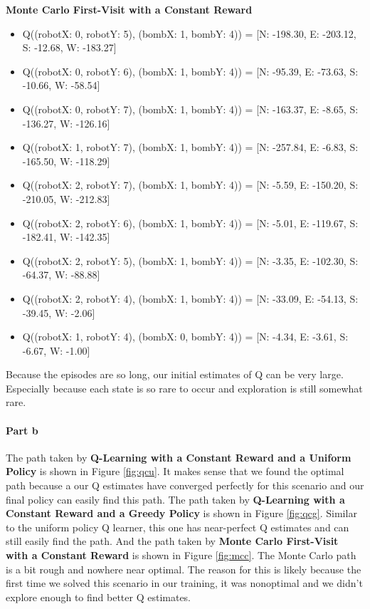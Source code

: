 \documentclass[12pt]{article}
\begin{document}
\textbf{Monte Carlo First-Visit with a Constant Reward}
\begin{itemize}
  \item Q((robotX: 0, robotY: 5), (bombX: 1, bombY: 4)) = [N: -198.30, E: -203.12, S: -12.68, W: -183.27]
  \item Q((robotX: 0, robotY: 6), (bombX: 1, bombY: 4)) = [N: -95.39, E: -73.63, S: -10.66, W: -58.54]
  \item Q((robotX: 0, robotY: 7), (bombX: 1, bombY: 4)) = [N: -163.37, E: -8.65, S: -136.27, W: -126.16]
  \item Q((robotX: 1, robotY: 7), (bombX: 1, bombY: 4)) = [N: -257.84, E: -6.83, S: -165.50, W: -118.29]
  \item Q((robotX: 2, robotY: 7), (bombX: 1, bombY: 4)) = [N: -5.59, E: -150.20, S: -210.05, W: -212.83]
  \item Q((robotX: 2, robotY: 6), (bombX: 1, bombY: 4)) = [N: -5.01, E: -119.67, S: -182.41, W: -142.35]
  \item Q((robotX: 2, robotY: 5), (bombX: 1, bombY: 4)) = [N: -3.35, E: -102.30, S: -64.37, W: -88.88]
  \item Q((robotX: 2, robotY: 4), (bombX: 1, bombY: 4)) = [N: -33.09, E: -54.13, S: -39.45, W: -2.06]
  \item Q((robotX: 1, robotY: 4), (bombX: 0, bombY: 4)) = [N: -4.34, E: -3.61, S: -6.67, W: -1.00]
\end{itemize}

Because the episodes are so long, our initial estimates of Q can be very large. Especially because each state is so rare to occur and exploration is still somewhat rare.

\paragraph{Part b} The path taken by \textbf{Q-Learning with a Constant Reward and a Uniform Policy} is shown in Figure \ref{fig:qcu}. It makes sense that we found the optimal path because a our Q estimates have converged perfectly for this scenario and our final policy can easily find this path. The path taken by \textbf{Q-Learning with a Constant Reward and a Greedy Policy} is shown in Figure \ref{fig:qcg}. Similar to the uniform policy Q learner, this one has near-perfect Q estimates and can still easily find the path. And the path taken by \textbf{Monte Carlo First-Visit with a Constant Reward} is shown in Figure \ref{fig:mcc}. The Monte Carlo path is a bit rough and nowhere near optimal. The reason for this is likely because the first time we solved this scenario in our training, it was nonoptimal and we didn't explore enough to find better Q estimates.
\end{document}

